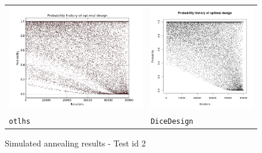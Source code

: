 \begin{figure}[!h]
\begin{center}
\begin{tabular}{>{\centering\arraybackslash}m{8cm}>{\centering\arraybackslash}m{8cm}}
 \includegraphics[scale=0.35]{lhs_mindist_proba.png}   & \includegraphics[scale=0.35]{dice_mindist_proba.png}\\
 \texttt{otlhs} & \texttt{DiceDesign}
\end{tabular}
\end{center}
\caption{Simulated annealing results - Test id 2}
\label{results_sa_test_id2}
\end{figure}

